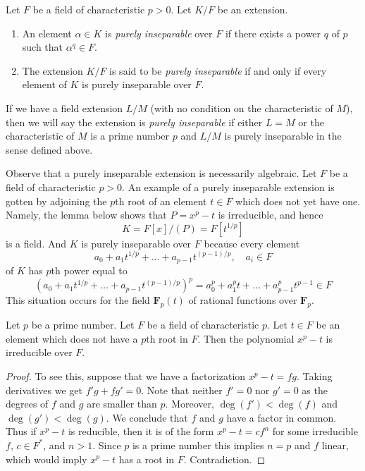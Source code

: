 \begin{definition}
\label{definition-purely-inseparable}
Let $F$ be a field of characteristic $p > 0$. Let $K/F$ be an extension.
\begin{enumerate}
\item An element $\alpha \in K$ is {\it purely inseparable} over $F$
if there exists a power $q$ of $p$ such that $\alpha^q \in F$.
\item The extension $K/F$ is said to be {\it purely inseparable}
if and only if every element of $K$ is purely inseparable over $F$.
\end{enumerate}
If we have a field extension $L/M$ (with no condition on the characteristic
of $M$), then we will say the extension is {\it purely inseparable}
if either $L = M$ or the characteristic of $M$ is a prime number $p$
and $L/M$ is purely inseparable in the sense defined above.
\end{definition}

\noindent
Observe that a purely inseparable extension is necessarily algebraic.
Let $F$ be a field of characteristic $p > 0$.
An example of a purely inseparable extension is gotten by adjoining
the $p$th root of an element $t \in F$ which does not yet have one. Namely,
the lemma below shows that $P = x^p - t$ is irreducible, and hence
$$
K = F[x]/(P) = F[t^{1/p}]
$$
is a field. And $K$ is purely inseparable over $F$ because every element
$$
a_0 + a_1t^{1/p} + \ldots + a_{p - 1}t^{(p - 1)/p},\quad a_i \in F
$$
of $K$ has $p$th power equal to
$$
(a_0 + a_1t^{1/p} + \ldots + a_{p - 1}t^{(p - 1)/p})^p =
a_0^p + a_1^p t + \ldots + a_{p - 1}^pt^{p - 1} \in F
$$
This situation occurs for the field
$\mathbf{F}_p(t)$ of rational functions over $\mathbf{F}_p$.

\begin{lemma}
\label{lemma-take-pth-root}
Let $p$ be a prime number. Let $F$ be a field of characteristic $p$.
Let $t \in F$ be an element which does not have a $p$th root in $F$.
Then the polynomial $x^p - t$ is irreducible over $F$.
\end{lemma}

\begin{proof}
To see this, suppose that we have a factorization
$x^p - t = f g$. Taking derivatives we get $f' g + f g' = 0$.
Note that neither $f' = 0$ nor $g' = 0$ as the degrees of $f$ and $g$
are smaller than $p$. Moreover, $\deg(f') < \deg(f)$ and $\deg(g') < \deg(g)$.
We conclude that $f$ and $g$ have a factor in common. Thus if $x^p - t$
is reducible, then it is of the form $x^p - t = c f^n$ for some irreducible
$f$, $c \in F^*$, and $n > 1$. Since $p$ is a prime number this
implies $n = p$ and $f$ linear, which would imply $x^p - t$ has a root
in $F$. Contradiction.
\end{proof}

